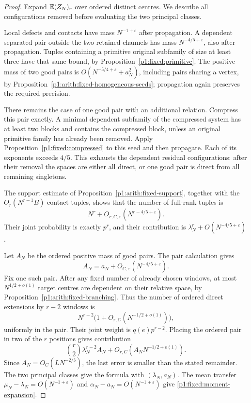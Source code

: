 \begin{proof}
Expand \(\mathbb E(Z_N)_r\) over ordered distinct centres.
We describe all configurations removed before evaluating
the two principal classes.

Local defects and contacts have mass \(N^{-1+\varepsilon}\)
after propagation. A dependent separated pair outside
the two retained channels has mass
\(N^{-4/5+\varepsilon}\), also after propagation.
Tuples containing a primitive original subfamily of
size at least three have that same bound, by
Proposition~\ref{p1:fixed:primitive}.
The positive mass of two good pairs is
\(O(N^{-5/4+\varepsilon}+a_N^2)\), including pairs sharing
a vertex, by
Proposition~\ref{p1:arith:fixed-homogeneous-seeds};
propagation again preserves the required precision.

There remains the case of one good pair with an
additional relation. Compress this pair exactly.
A minimal dependent subfamily of the compressed
system has at least two blocks and contains the
compressed block, unless an original primitive family
has already been removed. Apply
Proposition~\ref{p1:fixed:compressed} to this seed and
then propagate. Each of its exponents exceeds \(4/5\).
This exhausts the dependent residual configurations:
after their removal the spaces are either all direct,
or one good pair is direct from all remaining
singletons.

The support estimate
of Proposition~\ref{p1:arith:fixed-support}, together with
the \(O_r(N^{r-1}B)\) contact tuples, shows that the
number of full-rank tuples is
\[
 N^r+O_{r,C,\varepsilon}(N^{r-4/5+\varepsilon}).
\]
Their joint probability is exactly \(p^r\), and their
contribution is \(\lambda_N^r+O(N^{-4/5+\varepsilon})\).

Let \(A_N\) be the ordered positive mass of good pairs.
The pair calculation gives
\[
 A_N=a_N+O_{C,\varepsilon}(N^{-4/5+\varepsilon}).
\]
Fix one such pair. After any fixed number of already
chosen windows, at most \(N^{1/2+o(1)}\) target centres
are dependent on their relative space, by
Proposition~\ref{p1:arith:fixed-branching}. Thus the number of
ordered direct extensions by \(r-2\) windows is
\[
 N^{r-2}\bigl(1+O_{r,C}(N^{-1/2+o(1)})\bigr),
\]
uniformly in the pair. Their joint weight is
\(q(e)p^{r-2}\). Placing the ordered pair in two of
the \(r\) positions gives contribution
\[
 \binom r2\lambda_N^{r-2}A_N
       +O_{r,C}(A_NN^{-1/2+o(1)}).
\]
Since \(A_N=O_C(LN^{-2/3})\), the last error is
smaller than the stated remainder. The two principal
classes give the formula with \((\lambda_N,a_N)\).
The mean transfer
\(\mu_N-\lambda_N=O(N^{-1+\varepsilon})\) and
\(\alpha_N-a_N=O(N^{-1+\varepsilon})\) give
\eqref{p1:fixed:moment-expansion}.


\end{proof}
